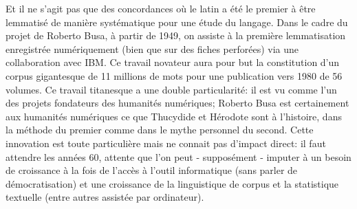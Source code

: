 Et il ne s'agit pas que des concordances où le latin a été le premier à être lemmatisé de manière systématique pour une étude du langage. Dans le cadre du projet de Roberto Busa, à partir de 1949, on assiste à la première lemmatisation enregistrée numériquement (bien que sur des fiches perforées) via une collaboration avec IBM. Ce travail novateur aura pour but la constitution d'un corpus gigantesque de 11 millions de mots pour une publication vers 1980 de 56 volumes. Ce travail titanesque a une double particularité: il est vu comme l'un des projets fondateurs des humanités numériques; Roberto Busa est certainement aux humanités numériques ce que Thucydide et Hérodote sont à l'histoire, dans la méthode du premier comme dans le mythe personnel du second. Cette innovation est toute particulière mais ne connait pas d'impact direct: il faut attendre les années 60, attente que l'on peut - supposément - imputer à un besoin de croissance à la fois de l'accès à l'outil informatique (sans parler de démocratisation) et une croissance de la linguistique de corpus et la statistique textuelle (entre autres assistée par ordinateur). 

